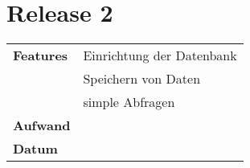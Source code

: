 
\section*{Release 2}
\label{sec:release_2}

\begin{tabular}{p{5cm} p{9cm}}
    \textbf{Features} & Einrichtung der Datenbank \\
    & Speichern von Daten \\
    & simple Abfragen  \\
    \hline
    \textbf{Aufwand} & \\
    \hline
    \textbf{Datum} & 
\end{tabular}
